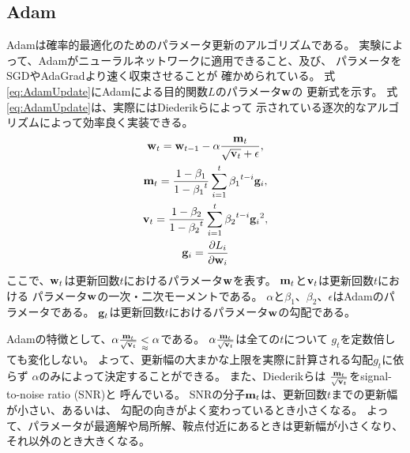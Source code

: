 \subsection{Adam}

Adam\cite{diederik15}は確率的最適化のためのパラメータ更新のアルゴリズムである。
実験によって、Adamがニューラルネットワークに適用できること、及び、
パラメータをSGDやAdaGrad\cite{john12}より速く収束させることが
確かめられている。
式\ref{eq:AdamUpdate}にAdamによる目的関数$L$のパラメータ$\mathbf{w}$の
更新式を示す。
式\ref{eq:AdamUpdate}は、実際にはDiederikら\cite{diederik15}によって
示されている逐次的なアルゴリズムによって効率良く実装できる。
\begin{gather} \label{eq:AdamUpdate}
  \mathbf{w}_t = \mathbf{w}_{t - 1}
                 - \alpha \frac{\mathbf{m}_t}
                               {\sqrt{\mathbf{v}_t} + \epsilon}, \\
  \mathbf{m}_t = \frac{1 - \beta_1}{1 - {\beta_1}^t}
                 \sum^t_{i = 1} {\beta_1}^{t - i} \mathbf{g}_i, \nonumber \\
  \mathbf{v}_t = \frac{1 - \beta_2}{1 - {\beta_2}^t}
                 \sum^t_{i = 1} {\beta_2}^{t - i} {\mathbf{g}_i}^2, \nonumber \\
  \mathbf{g}_i = \frac{\partial L_i}{\partial \mathbf{w}_i} \nonumber
\end{gather}
ここで、$\mathbf{w}_t$は更新回数$t$におけるパラメータ$\mathbf{w}$を表す。
$\mathbf{m}_t$と$\mathbf{v}_t$は更新回数$t$における
パラメータ$\mathbf{w}$の一次・二次モーメントである。
$\alpha$と$\beta_1$、$\beta_2$、$\epsilon$はAdamのパラメータである。
$\mathbf{g}_t$は更新回数$t$におけるパラメータ$\mathbf{w}$の勾配である。

Adamの特徴として、$\alpha \frac{\mathbf{m}_t}{\sqrt{\mathbf{v}_t}}
\underset{\approx}{<} \alpha$である。
$\alpha \frac{\mathbf{m}_t}{\sqrt{\mathbf{v}_t}}$は全ての$t$について
$g_t$を定数倍しても変化しない。
よって、更新幅の大まかな上限を実際に計算される勾配$g_t$に依らず
$\alpha$のみによって決定することができる。
また、Diederikら\cite{diederik15}は
$\frac{\mathbf{m}_t}{\sqrt{\mathbf{v}_t}}$をsignal-to-noise ratio (SNR)と
呼んでいる。
SNRの分子$\mathbf{m}_t$は、更新回数$t$までの更新幅が小さい、あるいは、
勾配の向きがよく変わっているとき小さくなる。
よって、パラメータが最適解や局所解、鞍点付近にあるときは更新幅が小さくなり、
それ以外のとき大きくなる。
